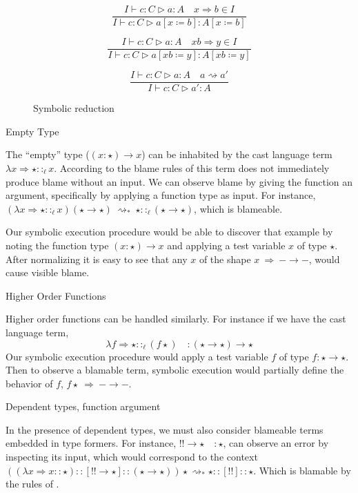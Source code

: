\begin{figure}
  \[
  \frac{I\vdash  c:C\vartriangleright a:A\quad x\Rightarrow b\in I}{I\vdash  c:C\vartriangleright a\left[x\coloneqq b\right]:A\left[x\coloneqq b\right]}
  \]
  
  \[
  \frac{I\vdash  c:C\vartriangleright a:A\quad xb\Rightarrow y\in I}{I\vdash  c:C\vartriangleright a\left[xb\coloneqq y\right]:A\left[xb\coloneqq y\right]}
  \]
  
  \[
  \frac{I\vdash  c:C\vartriangleright a:A\quad a\rightsquigarrow a'}{I\vdash  c:C\vartriangleright a':A}
  \]
\caption{Symbolic reduction}
\label{fig:sym-env-Sym-red}
\end{figure}
 
 
\begin{example}
  Empty Type

The ``empty'' type ($\left(x:\star\right)\rightarrow x$) can be inhabited by the cast language term $\lambda x\Rightarrow\star::_{\ell }x$.
According to the blame rules of  this term does not immediately produce blame without an input.
We can observe blame by giving the function an argument, specifically by applying a function type as input.
For instance, $(\lambda x\Rightarrow\star::_{\ell }x)(\star\rightarrow\star)\ \rightsquigarrow_{*}\ \star::_{\ell }(\star\rightarrow\star)$, which is blameable.

Our symbolic execution procedure would be able to discover that example by noting the function type $\left(x:\star\right)\rightarrow x$ and applying a test variable $x$ of type $\star$.
After normalizing it is easy to see that any $x$ of the shape $x\ \Rightarrow\ -\rightarrow-$, would cause visible blame.
\end{example}


\begin{example}
Higher Order Functions

Higher order functions can be handled similarly.
For instance if we have the cast language term,
\[
\lambda f\Rightarrow\star::_{\ell }(f\star) \quad : \left(\star\rightarrow\star\right)\rightarrow\star
\]
  Our symbolic execution procedure would apply a test variable $f$ of type $f:\star\rightarrow\star$.
Then to observe a blamable term, symbolic execution would partially define the behavior of $f$, $f\star\ \Rightarrow\ -\rightarrow-$.
\end{example}

  
 \begin{example}
 Dependent types, function argument
  
 In the presence of dependent types, we must also consider blameable terms embedded in type formers.
 For instance, $!!\rightarrow\star\quad:\star$, can observe an error by inspecting its input, which would correspond to the context $\left(\left(\lambda x\Rightarrow x::\star\right)::[!!\rightarrow\star]::\left(\star\rightarrow\star\right)\right)\star\rightsquigarrow_{*}\star::[!!]::\star$.
 Which is blamable by the rules of .
\end{example}

